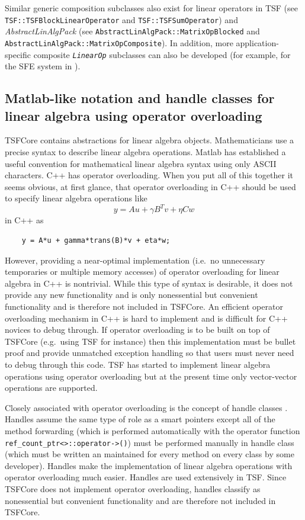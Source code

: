 Similar generic composition subclasses also exist for linear operators
in TSF (see \texttt{TSF\-::TSF\-Block\-Linear\-Operator} and
\texttt{TSF\-::TSF\-Sum\-Operator}) and \textit{AbstractLinAlgPack} (see
\texttt{Abstract\-Lin\-Alg\-Pack\-::Matrix\-Op\-Blocked} and
\texttt{Abstract\-Lin\-Alg\-Pack\-::Matrix\-Op\-Composite}).  In addition, more
application-specific composite \texttt{\textit{LinearOp}} subclasses
can also be developed (for example, for the SFE system in
\cite{ref:sfe}).

%
\subsection{Matlab-like notation and handle classes for linear algebra
using operator overloading}
\label{tsfcore:sec:operator_overloading}
%

TSFCore contains abstractions for linear algebra objects.  Mathematicians
use a precise syntax to describe linear algebra operations.  Matlab
\cite{ref:matlab} has established a useful convention for mathematical
linear algebra syntax using only ASCII characters.  C++ has operator
overloading.  When you put all of this together it seems obvious, at
first glance, that operator overloading in C++ should be used to
specify linear algebra operations like
%
\[
y = A u + \gamma B^T v + \eta C w
\]
%
in C++ as
%
\begin{verbatim}
    y = A*u + gamma*trans(B)*v + eta*w;
\end{verbatim}

\noindent However, providing a near-optimal implementation (i.e.~no unnecessary
temporaries or multiple memory accesses) of operator overloading for
linear algebra in C++ is nontrivial.  While this type of syntax is
desirable, it does not provide any new functionality and is only
nonessential but convenient functionality and is therefore not included in TSFCore.
An efficient operator overloading mechanism in C++ is hard to
implement and is difficult for C++ novices to debug through.  If
operator overloading is to be built on top of TSFCore (e.g.~using TSF for
instance) then this implementation must be bullet proof and provide
unmatched exception handling so that users must never need to debug
through this code.  TSF has started to implement linear algebra
operations using operator overloading but at the present time only
vector-vector operations are supported.

Closely associated with operator overloading is the concept of handle
classes \cite{ref:advanced_c++_coplien}.  Handles assume the same type
of role as a smart pointers except all of the method forwarding (which
is performed automatically with the operator function
\texttt{ref\_count\_ptr<>\-::operator->()}) must be performed manually
in handle class (which must be written an maintained for every method
on every class by some developer).  Handles make the implementation of
linear algebra operations with operator overloading much easier.
Handles are used extensively in TSF.  Since TSFCore does not implement
operator overloading, handles classify as nonessential but convenient
functionality and are therefore not included in TSFCore.

